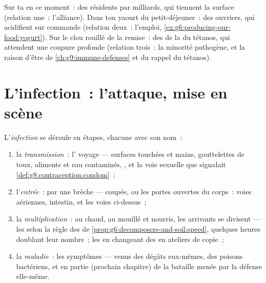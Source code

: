 \begin{example}\label{ex:g9:microbes-and-infection:relations}
Sur ta  en ce moment~: des résidents par milliards, qui
tiennent la surface (relation une~: l'alliance). Dans ton
yaourt du petit-déjeuner~: des ouvriers, qui acidifient sur
commande (relation deux~: l'emploi,
\cref{ex:g6:producing-our-food:yogurt}). Sur le clou
rouillé de la remise~: des  de la  du tétanos,
qui attendent une coupure profonde (relation trois~: la
minorité pathogène, et la raison d'être de
\cref{ch:g9:immune-defenses} et du rappel du tétanos).
\end{example}

\section{L'infection~: l'attaque, mise en scène}

\begin{definition}\label{def:g9:microbes-and-infection:stages}
L'\emph{infection} se déroule en étapes,
chacune avec son nom~:
\begin{enumerate}
  \item la \emph{transmission}~: l' voyage
        --- surfaces touchées et mains, gouttelettes de
        toux, aliments et eau contaminés, , et la voie
        sexuelle que signalait
        \cref{def:g8:contraception:condom}~;
  \item l'\emph{entrée}~: par une brèche ---  coupée,
        ou les portes ouvertes du corps~: voies aériennes,
        intestin, et les voies ci-dessus~;
  \item la \emph{multiplication}~: au chaud, au mouillé et
        nourris, les arrivants se divisent --- les
         selon la règle des  de
        \cref{prop:g6:decomposers-and-soil:speed}, quelques
        heures doublant leur nombre~; les  en changeant
        des  en ateliers de copie~;
  \item la \emph{maladie}~: les symptômes --- venus des
        dégâts eux-mêmes, des poisons bactériens, et en
        partie (prochain chapitre) de la bataille menée par
        la défense elle-même.
\end{enumerate}
\end{definition}

